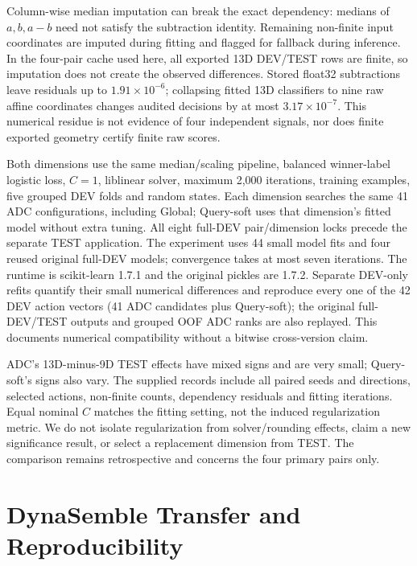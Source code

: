 \documentclass[11pt,a4paper]{article}
\begin{document}
Column-wise median imputation can break the exact dependency: medians of $a,b,a-b$ need not satisfy the subtraction identity. Remaining non-finite input coordinates are imputed during fitting and flagged for fallback during inference. In the four-pair cache used here, all exported 13D DEV/TEST rows are finite, so imputation does not create the observed differences. Stored float32 subtractions leave residuals up to $1.91\times10^{-6}$; collapsing fitted 13D classifiers to nine raw affine coordinates changes audited decisions by at most $3.17\times10^{-7}$. This numerical residue is not evidence of four independent signals, nor does finite exported geometry certify finite raw scores.

Both dimensions use the same median/scaling pipeline, balanced winner-label logistic loss, $C=1$, liblinear solver, maximum 2,000 iterations, training examples, five grouped DEV folds and random states. Each dimension searches the same 41 ADC configurations, including Global; Query-soft uses that dimension's fitted model without extra tuning. All eight full-DEV pair/dimension locks precede the separate TEST application. The experiment uses 44 small model fits and four reused original full-DEV models; convergence takes at most seven iterations. The runtime is scikit-learn 1.7.1 and the original pickles are 1.7.2. Separate DEV-only refits quantify their small numerical differences and reproduce every one of the 42 DEV action vectors (41 ADC candidates plus Query-soft); the original full-DEV/TEST outputs and grouped OOF ADC ranks are also replayed. This documents numerical compatibility without a bitwise cross-version claim.


ADC's 13D-minus-9D TEST effects have mixed signs and are very small; Query-soft's signs also vary. The supplied records include all paired seeds and directions, selected actions, non-finite counts, dependency residuals and fitting iterations. Equal nominal $C$ matches the fitting setting, not the induced regularization metric. We do not isolate regularization from solver/rounding effects, claim a new significance result, or select a replacement dimension from TEST. The comparison remains retrospective and concerns the four primary pairs only.
\FloatBarrier

\section{DynaSemble Transfer and Reproducibility}
\label{app:dynasemble}
\end{document}
